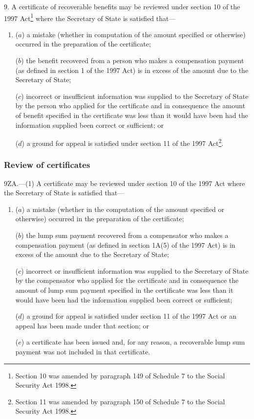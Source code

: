 \documentclass[12pt,a4paper]{article}
\begin{document}
\renewcommand\parthead{--- Part II Chapter III}

9.  A certificate of recoverable benefits may be reviewed under section 10 of the 1997 Act\footnote{\frenchspacing Section 10 was amended by paragraph 149 of Schedule 7 to the Social Security Act 1998.} where the Secretary of State is satisfied that—
\begin{enumerate}\item[]
($a$) a mistake (whether in computation of the amount specified or otherwise) occurred in the preparation of the certificate;

($b$) the benefit recovered from a person who makes a compensation payment (as defined in section 1 of the 1997 Act) is in excess of the amount due to the Secretary of State;

($c$) incorrect or insufficient information was supplied to the Secretary of State by the person who applied for the certificate and in consequence the amount of benefit specified in the certificate was less than it would have been had the information supplied been correct or sufficient; or

($d$) a ground for appeal is satisfied under section 11 of the 1997 Act\footnote{\frenchspacing Section 11 was amended by paragraph 150 of Schedule 7 to the Social Security Act 1998.}.
\end{enumerate}

\subsubsection[9ZA. Review of certificates]{Review of certificates}

9ZA.---(1)  A certificate may be reviewed under section 10 of the 1997 Act where the Secretary of State is satisfied that—
\begin{enumerate}\item[]
($a$) a mistake (whether in the computation of the amount specified or otherwise) occurred in the preparation of the certificate;

($b$) the lump sum payment recovered from a compensator who makes a compensation payment (as defined in section 1A(5) of the 1997 Act) is in excess of the amount due to the Secretary of State;

($c$) incorrect or insufficient information was supplied to the Secretary of State by the compensator who applied for the certificate and in consequence the amount of lump sum payment specified in the certificate was less than it would have been had the information supplied been correct or sufficient;

($d$) a ground for appeal is satisfied under section 11 of the 1997 Act or an appeal has been made under that section; or

($e$) a certificate has been issued and, for any reason, a recoverable lump sum payment was not included in that certificate.
\end{enumerate}
\end{document}
